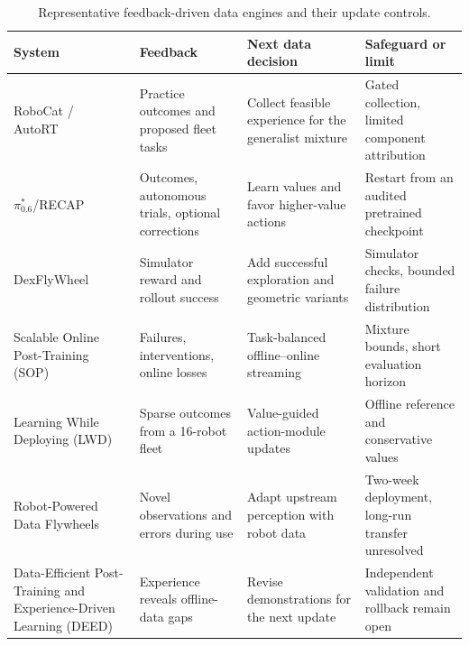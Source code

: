 \begin{table}[t]
\centering
\caption{Representative feedback-driven data engines and their update controls.}
\label{tab:data-engines}
\scriptsize
\setlength{\tabcolsep}{4pt}
\renewcommand{\arraystretch}{1.08}
\begin{tabularx}{\textwidth}{@{}p{3.0cm}p{3.7cm}p{5.1cm}X@{}}
\toprule
System & Feedback & Next data decision & Safeguard or limit \\
\midrule
RoboCat / AutoRT~\cite{bousmalis2023robocat_2306_11706,ahn2024autort_2401_12963}
& Practice outcomes and proposed fleet tasks
& Collect feasible experience for the generalist mixture
& Gated collection, limited component attribution \\
$\pi^{*}_{0.6}$/RECAP~\cite{intelligence20250_2511_14759}
& Outcomes, autonomous trials, optional corrections
& Learn values and favor higher-value actions
& Restart from an audited pretrained checkpoint \\
DexFlyWheel~\cite{zhu2025dexflywheel_2509_23829}
& Simulator reward and rollout success
& Add successful exploration and geometric variants
& Simulator checks, bounded failure distribution \\
Scalable Online Post-Training (SOP)~\cite{pan2026sop_2601_03044}
& Failures, interventions, online losses
& Task-balanced offline--online streaming
& Mixture bounds, short evaluation horizon \\
Learning While Deploying (LWD)~\cite{wang2026learning_2605_00416}
& Sparse outcomes from a 16-robot fleet
& Value-guided action-module updates
& Offline reference and conservative values \\
Robot-Powered Data Flywheels~\cite{grannen2025robot_2511_19647}
& Novel observations and errors during use
& Adapt upstream perception with robot data
& Two-week deployment, long-run transfer unresolved \\
Data-Efficient Post-Training and Experience-Driven Learning (DEED)~\cite{sis2026closing_2607_20345}
& Experience reveals offline-data gaps
& Revise demonstrations for the next update
& Independent validation and rollback remain open \\
\bottomrule
\end{tabularx}
\end{table}
